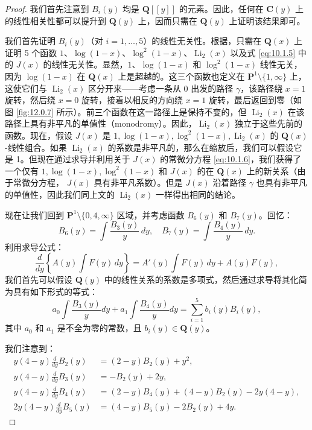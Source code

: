 \begin{proof}
我们首先注意到 $B_i(y)$ 均是 $\mathbf{Q}[\! [y]\!]$ 的元素。因此，任何在 $\mathbf{C}(y)$ 上的线性相关性都可以提升到 $\mathbf{Q}(y)$ 上，因而只需在 $\mathbf{Q}(y)$ 上证明该结果即可。

我们首先证明 $B_i(y)$（对 $i = 1, \dots, 5$）的线性无关性。根据，只需在 $\mathbf{Q}(x)$ 上证明 5 个函数 $1$、$\log(1-x)$、$\log^2(1-x)$、$\operatorname{Li}_2(x)$ 以及式 \eqref{eq:10.1.5} 中的 $J(x)$ 的线性无关性。显然，$1$、$\log(1-x)$ 和 $\log^2(1-x)$ 线性无关，因为 $\log(1-x)$ 在 $\mathbf{Q}(x)$ 上是超越的。这三个函数也定义在 $\mathbf{P}^1 \setminus \{1,\infty\}$ 上，这使它们与 $\operatorname{Li}_2(x)$ 区分开来——考虑一条从 0 出发的路径 $\gamma$，该路径绕 $x=1$ 旋转，然后绕 $x=0$ 旋转，接着以相反的方向绕 $x=1$ 旋转，最后返回到零（如图 \ref{fig:12.0.7} 所示）。前三个函数在这一路径上是保持不变的，但 $\operatorname{Li}_2(x)$ 在该路径上具有非平凡的单值性（monodromy）。因此，$\operatorname{Li}_2(x)$ 独立于这些先前的函数。现在，假设 $J(x)$ 是 $1, \log(1-x), \log^2(1-x), \operatorname{Li}_2(x)$ 的 $\mathbf{Q}(x)$-线性组合。如果 $\operatorname{Li}_2(x)$ 的系数是非平凡的，那么在缩放后，我们可以假设它是 1。但现在通过求导并利用关于 $J(x)$ 的常微分方程 \eqref{eq:10.1.6}，我们获得了一个仅有 $1, \log(1-x), \log^2(1-x)$ 和 $J(x)$ 的在 $\mathbf{Q}(x)$ 上的新关系（由于常微分方程， $J(x)$ 具有非平凡系数）。但是 $J(x)$ 沿着路径 $\gamma$ 也具有非平凡的单值性，因此我们同上文的 $\operatorname{Li}_2(x)$ 一样得出相同的结论。

现在让我们回到 $\mathbf{P}^1 \setminus \{0,4,\infty\}$ 区域，并考虑函数 $B_6(y)$ 和 $B_7(y)$。回忆：
\[ B_6(y) = \int \frac{B_3(y)}{y} \, dy, \quad B_7(y) = \int \frac{B_4(y)}{y} \, dy. \]
利用求导公式：
\begin{equation}\label{eq:12.0.2}\tag{12.0.2}
\frac{d}{dy} \left\{ A(y) \int F(y) \, dy \right\} = A'(y) \int F(y) \, dy + A(y) F(y),
\end{equation}
我们首先可以假设 $\mathbf{Q}(y)$ 中的线性关系的系数是多项式，然后通过求导将其化简为具有如下形式的等式：
\begin{equation}\label{eq:12.0.3}\tag{12.0.3}
a_0 \int \frac{B_3(y)}{y} dy + a_1 \int \frac{B_4(y)}{y} dy = \sum_{i=1}^5 b_i(y) B_i(y),
\end{equation}
其中 $a_0$ 和 $a_1$ 是不全为零的常数，且 $b_i(y) \in \mathbf{Q}(y)$。

我们注意到：
\begin{equation}\label{eq:12.0.4}\tag{12.0.4}
\begin{aligned}
y(4-y)\frac{d}{dy}B_{2}(y) &= (2-y)B_{2}(y) + y^{2}, \\
y(4-y)\frac{d}{dy}B_{3}(y) &= -B_{2}(y) + 2y, \\
y(4-y)\frac{d}{dy}B_{4}(y) &= (2-y)B_{4}(y) + (4-y)B_{2}(y) - 2y(4-y), \\
2y(4-y)\frac{d}{dy}B_{5}(y) &= (4-y)B_{5}(y) - 2B_{2}(y) + 4y.
\end{aligned}
\end{equation}


\end{proof}
